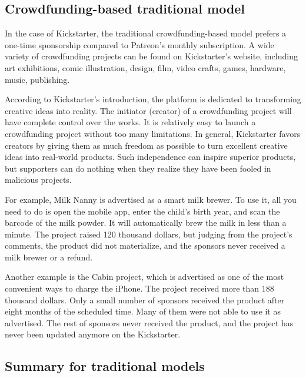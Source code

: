 \documentclass[12pt,a4paper]{article}
\begin{document}
    \subsection{Crowdfunding-based traditional model}\label{subsec:tradition_kickstarter}

    In the case of Kickstarter, the traditional crowdfunding-based model prefers
    a one-time sponsorship compared to Patreon's monthly subscription.
    A wide variety of crowdfunding projects can be found on Kickstarter's
    website\cite{kickstarter_homepage}, including art exhibitions, comic illustration,
    design, film, video crafts, games, hardware, music, publishing.

    According to Kickstarter's introduction\cite{kickstarter_about}, the platform
    is dedicated to transforming creative ideas into reality.
    The initiator (creator) of a crowdfunding project will have complete control
    over the works.
    It is relatively easy to launch a crowdfunding project without too many
    limitations.
    In general, Kickstarter favors creators by giving them as much freedom as
    possible to turn excellent creative ideas into real-world products.
    Such independence can inspire superior products, but supporters can do
    nothing when they realize they have been fooled in malicious projects.

    For example, Milk Nanny\cite{kickstarter_milk_nanny} is advertised as a smart
    milk brewer.
    To use it, all you need to do is open the mobile app, enter the child's birth
    year, and scan the barcode of the milk powder.
    It will automatically brew the milk in less than a minute.
    The project raised 120 thousand dollars, but judging from the project's
    comments, the product did not materialize, and the sponsors never received
    a milk brewer or a refund.

    Another example is the Cabin project\cite{kickstarter_cabin}, which is
    advertised as one of the most convenient ways to charge the iPhone.
    The project received more than 188 thousand dollars.
    Only a small number of sponsors received the product after eight months of
    the scheduled time.
    Many of them were not able to use it as advertised.
    The rest of sponsors never received the product, and the project has never
    been updated anymore on the Kickstarter.

    \subsection{Summary for traditional models}\label{subsec:tradition_summary}
\end{document}
